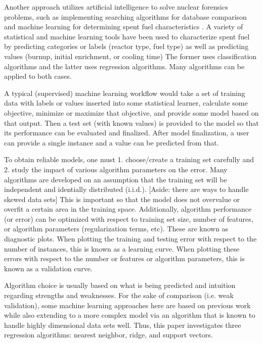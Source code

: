 Another approach utilizes artificial intelligence to solve nuclear forensics
problems, such as implementing searching algorithms for database comparison and
machine learning for determining spent fuel characteristics .  A variety of statistical and machine
learning tools have been used to characterize spent fuel by predicting
categories or labels (reactor type, fuel type) as well as predicting values
(burnup, initial enrichment, or cooling time) The former uses classification
algorithms and the latter uses regression algorithms. Many algorithms can be
applied to both cases.

A typical (supervised) machine learning workflow would take a set of training
data with labels or values inserted into some statistical learner, calculate
some objective, minimize or maximize that objective, and provide some model
based on that output. Then a test set (with known values) is provided to the
model so that its performance can be evaluated and finalized. After model
finalization, a user can provide a single instance and a value can be predicted
from that. 

To obtain reliable models, one must 1. choose/create a training set carefully
and 2. study the impact of various algorithm parameters on the error. Many
algorithms are developed on an assumption that the training set will be
independent and identially distributed (i.i.d.). [Aside: there are ways to
handle skewed data sets] This is important so that the model does not overvalue
or overfit a certain area in the training space. Additionally, algorithm
performance (or error) can be optimized with respect to training set size,
number of features, or algorithm parameters (regularization terms, etc).  These
are known as diagnostic plots. When plotting the training and testing error
with respect to the number of instances, this is known as a learning curve.
When plotting these errors with respect to the number or features or algorithm
parameters, this is known as a validation curve. 

Algorithm choice is usually based on what is being predicted and intuition
regarding strengths and weaknesses.  For the sake of comparison (i.e. weak
validation), some machine learning approaches here are based on previous
work while also extending to a more complex model via an
algorithm that is known to handle highly dimensional data sets well. Thus, this
paper investigates three regression algorithms: nearest neighbor, ridge, and
support vectors.

